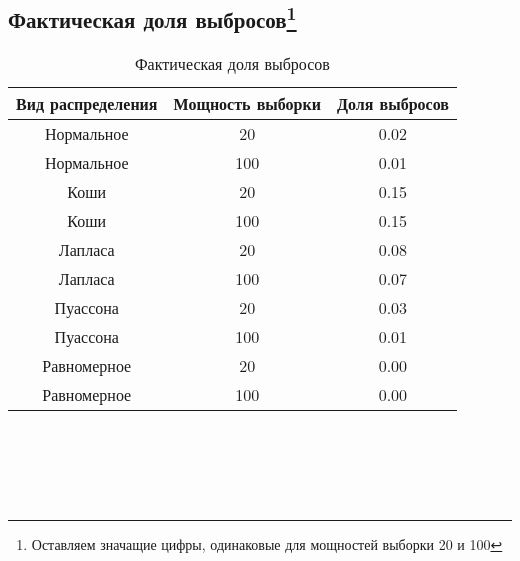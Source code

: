 \documentclass{article}
\begin{document}
\subsection[Фактическая доля выбросов]{Фактическая доля выбросов\protect\footnote{Оставляем значащие цифры, одинаковые для мощностей выборки 20 и 100}}
\begin{table}[hb]
\begin{center}
\begin{tabular}{|c|c|c|}
\hline 
Вид распределения & Мощность выборки & Доля выбросов \\ 
\hline 
Нормальное & 20 & 0.02 \\ 
\hline 
Нормальное & 100 & 0.01 \\ 
\hline 
Коши & 20 & 0.15\\ 
\hline 
Коши & 100 & 0.15 \\ 
\hline 
Лапласа & 20 & 0.08 \\ 
\hline 
Лапласа & 100 & 0.07 \\ 
\hline 
Пуассона & 20 & 0.03 \\ 
\hline 
Пуассона & 100 & 0.01 \\ 
\hline 
Равномерное & 20 & 0.00 \\ 
\hline 
Равномерное & 100 & 0.00 \\ 
\hline 
\end{tabular} 
\caption{Фактическая доля выбросов}
\end{center}
\end{table}
\; \\ \; \\ \; \\ \; \\ \; 
\end{document}
